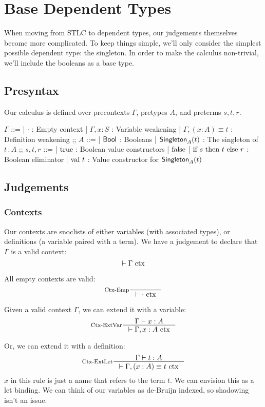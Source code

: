 \section{Base Dependent Types}
When moving from STLC to dependent types, our judgements themselves become more complicated.
To keep things simple, we'll only consider the simplest possible dependent type: the singleton.
In order to make the calculus non-trivial, we'll include the booleans as a base type.

\subsection{Presyntax}
Our calculus is defined over precontexts $\Gamma$, pretypes $A$, and preterms $s, t, r$.

\begin{bnf}
$\Gamma$ ::=
  | $\cdot$ : Empty context
  | $\Gamma, x \colon S$ : Variable weakening
  | $\Gamma, (x \colon A) \equiv t$ : Definition weakening
;;
$A$ ::=
  | $\textsf{Bool}$ : Booleans
  | $\textsf{Singleton}_{A}(t)$ : The singleton of $t \,\colon A$
;;
$s, t, r$ ::=
| $\textrm{true}$ : Boolean value constructors
| $\textrm{false}$
| $\textrm{if } s \textrm{ then } t \textrm{ else } r$ : Boolean eliminator
| $\textrm{val } t$ : Value constructor for $\textsf{Singleton}_{A}(t)$
\end{bnf}


\subsection{Judgements}
\subsubsection{Contexts}
Our contexts are snoclists of either variables (with associated types), or definitions (a variable paired with a term).
We have a judgement to declare that $\Gamma$ is a valid context:
\[
  \vdash \Gamma \textrm{ ctx}
\]

All empty contexts are valid:
\[
  \inference[Ctx-Emp]{}{\vdash \ctx{\cdot}}
\]

Given a valid context $\Gamma$, we can extend it with a variable:
\[
  \inference[Ctx-ExtVar]
  {\Gamma \vdash x : A}
  {\vdash \ctx{\Gamma, x : A}}
\]

Or, we can extend it with a definition:
\[
  \inference[Ctx-ExtLet]
  {\Gamma \vdash t : A}
  {\vdash \ctx{\Gamma, (x : A) \equiv t}}
\]
$x$ in this rule is just a name that refers to the term $t$.
We can envision this as a let binding.
We can think of our variables as de-Bruijn indexed, so shadowing isn't an issue.

